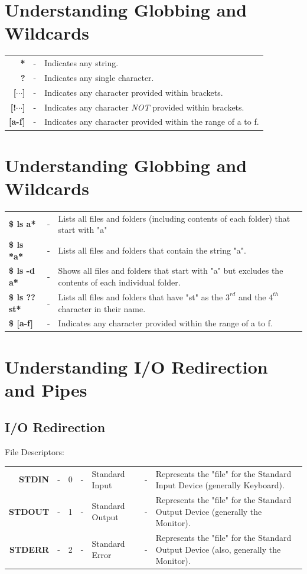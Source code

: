 \documentclass{report}
\begin{document}
	\section{Understanding Globbing and Wildcards}
	\begin{tabular}{rcl}
		\textbf{*} &- &Indicates any string. \\
		\textbf{?} &- &Indicates any single character. \\
		\textbf{[$\cdots$]} &- &Indicates any character provided within brackets. \\
		\textbf{[!$\cdots$]} &- &Indicates any character \textit{NOT} provided within brackets. \\
		\textbf{[a-f]} &- &Indicates any character provided within the range of a to f. \\
	\end{tabular}
	
	\section{Understanding Globbing and Wildcards}
	\noindent
	\begin{tabular}{lcp{}}
		\textbf{\$ ls a*} &- &Lists all files and folders (including contents of each folder) that start with "a" \\
		\textbf{\$ ls *a*} &- &Lists all files and folders that contain the string "a". \\
		\textbf{\$ ls -d a*} &- &Shows all files and folders that start with "a" but excludes the contents of each individual folder. \\
		\textbf{\$ ls ??st*} &- &Lists all files and folders that have "st" as the $3^{rd}$ and the $4^{th}$ character in their name. \\
		\textbf{\$ [a-f]} &- &Indicates any character provided within the range of a to f. \\
	\end{tabular}

	\section{Understanding I/O Redirection and Pipes}
	\subsection{I/O Redirection}
	File Descriptors: 

	\noindent
	\begin{tabular}{rccclcp{}}
		\textbf{STDIN} &- &0 &- &Standard Input &- &Represents the "file" for the Standard Input Device (generally Keyboard). \\
		\textbf{STDOUT} &- &1 &- &Standard Output &- &Represents the "file" for the Standard Output Device (generally the Monitor). \\
		\textbf{STDERR} &- &2 &- &Standard Error &- &Represents the "file" for the Standard Output Device (also, generally the Monitor). \\
	\end{tabular}
\end{document}
